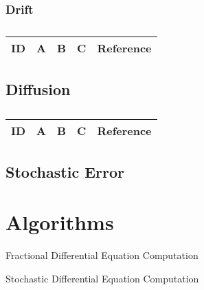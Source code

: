 \subsubsection{Drift}

\centering
\begin{table}[H]\footnotesize
	\caption{}
	\begin{tabular}{rp{1cm}p{2cm}p{3cm}p{1cm}}
		\hline
		ID & A & B & C & Reference \\
		\hline
		\hline
	\end{tabular}
\end{table}
\raggedright

\subsection{Diffusion}

\centering
\begin{table}[H]\footnotesize
	\caption{}
	\begin{tabular}{rp{1cm}p{2cm}p{3cm}p{1cm}}
		\hline
		ID & A & B & C & Reference \\
		\hline
		\hline
	\end{tabular}
\end{table}
\raggedright

\subsection{Stochastic Error}


\section{Algorithms}
\begin{algorithm}[H]
\begin{algorithmic}[1]
\end{algorithmic}
\caption{Fractional Differential Equation Computation}
	\label{Algorithm_1}
\end{algorithm}

\begin{algorithm}[H]
\begin{algorithmic}[1]
\end{algorithmic}
\caption{Stochastic Differential Equation Computation}
	\label{Algorithm_2}
\end{algorithm}

